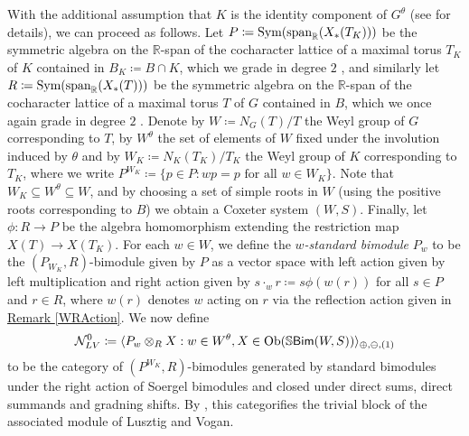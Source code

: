 \noindent With the additional assumption that $K$ is the identity component of $G^\theta$ (see \cite{LR22} for details), we can proceed as follows. Let $P \coloneqq \textnormal{Sym}(\textnormal{span}_\mathbb{R}(X_*(T_K)))$ be the symmetric algebra on the $\mathbb{R}$-span of the cocharacter lattice of a maximal torus $T_K$ of $K$ contained in $B_K \coloneqq B \cap K$, which we grade in degree $2$%
, and similarly let $R \coloneqq \textnormal{Sym}(\textnormal{span}_\mathbb{R}(X_*(T)))$ be the symmetric algebra on the $\mathbb{R}$-span of the cocharacter lattice of a maximal torus $T$ of $G$ contained in $B$, which we once again grade in degree $2$%
. Denote by $W \coloneqq N_G(T)/T$ the Weyl group of $G$ corresponding to $T$, by $W^\theta$ the set of elements of $W$ fixed under the involution induced by $\theta$ and by $W_K \coloneqq N_K(T_K)/T_K$ the Weyl group of $K$ corresponding to $T_K$, where we write $P^{W_K} \coloneqq \{p \in P : wp = p\text{ for all }w \in W_K\}$. Note that $W_K \subseteq W^\theta \subseteq W$, and by choosing a set of simple roots in $W$ (using the positive roots corresponding to $B$) we obtain a Coxeter system $(W, S)$. Finally, let $\phi : R \to P$ be the algebra homomorphism extending the restriction map $X(T) \to X(T_K)$. For each $w \in W$, we define the {\em $w$-standard bimodule} $P_w$ to be the $(P_{W_K}, R)$-bimodule given by $P$ as a vector space with left action given by left multiplication and right action given by $s\cdot_w r \coloneqq s\phi(w(r))$ for all $s \in P$ and $r \in R$, where $w(r)$ denotes $w$ acting on $r$ via the reflection action given in \hyperref[WRAction]{Remark \ref*{WRAction}}. We now define\\[-1.1\linespacing]
\begin{align*}
\begin{split}
\mathcal{N}_{LV}^0 \coloneqq \langle P_w \otimes_R X : w \in W^\theta, X \in \textnormal{Ob}(\mathbb{S}\textnormal{\textsf{Bim}}(W, S))\rangle_{\oplus,\ominus,(1)}
\end{split}
\end{align*}
\noindent to be the category of $(P^{W_K}, R)$-bimodules generated by standard bimodules under the right action of Soergel bimodules and closed under direct sums, direct summands and gradning shifts. By \cite[Theorem 1.3.1]{LR22}, this categorifies the trivial block of the associated module of Lusztig and Vogan.\\

